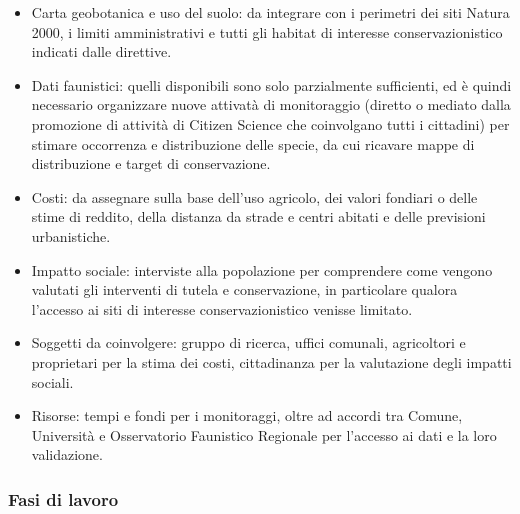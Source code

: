 \documentclass[
  a4paper,
]{book}
\providecommand{\tightlist}{%
  \setlength{\itemsep}{0pt}\setlength{\parskip}{0pt}}
\begin{document}
\begin{itemize}
\tightlist
\item
  Carta geobotanica e uso del suolo: da integrare con i perimetri dei siti Natura 2000, i limiti amministrativi e tutti gli habitat di interesse conservazionistico indicati dalle direttive.
\item
  Dati faunistici: quelli disponibili sono solo parzialmente sufficienti, ed è quindi necessario organizzare nuove attivatà di monitoraggio (diretto o mediato dalla promozione di attività di Citizen Science che coinvolgano tutti i cittadini) per stimare occorrenza e distribuzione delle specie, da cui ricavare mappe di distribuzione e target di conservazione.
\item
  Costi: da assegnare sulla base dell'uso agricolo, dei valori fondiari o delle stime di reddito, della distanza da strade e centri abitati e delle previsioni urbanistiche.
\item
  Impatto sociale: interviste alla popolazione per comprendere come vengono valutati gli interventi di tutela e conservazione, in particolare qualora l'accesso ai siti di interesse conservazionistico venisse limitato.
\item
  Soggetti da coinvolgere: gruppo di ricerca, uffici comunali, agricoltori e proprietari per la stima dei costi, cittadinanza per la valutazione degli impatti sociali.
\item
  Risorse: tempi e fondi per i monitoraggi, oltre ad accordi tra Comune, Università e Osservatorio Faunistico Regionale per l'accesso ai dati e la loro validazione.
\end{itemize}

\subsubsection{Fasi di lavoro}\label{fasi-di-lavoro}
\end{document}
